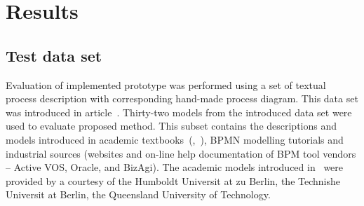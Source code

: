 \chapter{Results}
\label{cha:validation}
\section{Test data set}
Evaluation of implemented prototype was performed using a set of textual process description with corresponding hand-made process diagram. This data set was introduced in article~\cite{friedrich-2011}. Thirty-two models from the introduced data set were used to evaluate proposed method. This subset contains the descriptions and models introduced in academic textbooks~(\cite{white-bpmn-reference-guide},~\cite{praxishandbuch}), BPMN modelling tutorials and industrial sources (websites and on-line help documentation of BPM tool vendors -- Active VOS, Oracle, and BizAgi). The academic models introduced in~\cite{friedrich-2011} were provided by a courtesy of the Humboldt Universit at zu Berlin, the Technishe Universit at Berlin, the Queensland University of Technology.


